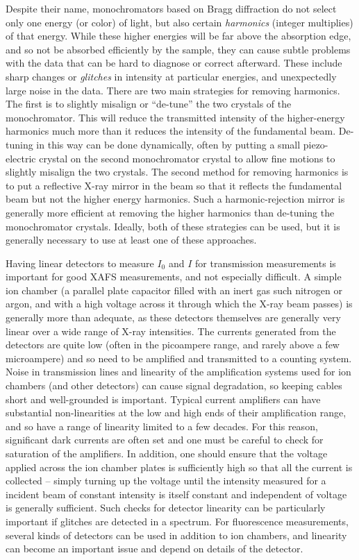Despite their name, monochromators based on Bragg diffraction do not select
only one energy (or color) of light, but also certain {\emph{harmonics}}
(integer multiplies) of that energy.  While these higher energies will be
far above the absorption edge, and so not be absorbed efficiently by the
sample, they can cause subtle problems with the data that can be hard to
diagnose or correct afterward.  These include sharp changes or
{\emph{glitches}} in intensity at particular energies, and unexpectedly
large noise in the data.  There are two main strategies for removing
harmonics.  The first is to slightly misalign or ``de-tune'' the two
crystals of the monochromator.  This will reduce the transmitted intensity
of the higher-energy harmonics much more than it reduces the intensity of
the fundamental beam.  De-tuning in this way can be done dynamically, often
by putting a small piezo-electric crystal on the second monochromator
crystal to allow fine motions to slightly misalign the two crystals.  The
second method for removing harmonics is to put a reflective X-ray mirror in
the beam so that it reflects the fundamental beam but not the higher energy
harmonics.  Such a harmonic-rejection mirror is generally more efficient at
removing the higher harmonics than de-tuning the monochromator crystals.
Ideally, both of these strategies can be used, but it is generally
necessary to use at least one of these approaches.

Having linear detectors to measure $I_0$ and $I$ for transmission
measurements is important for good XAFS measurements, and not especially
difficult.  A simple ion chamber (a parallel plate capacitor filled with an
inert gas such nitrogen or argon, and with a high voltage across it through
which the X-ray beam passes) is generally more than adequate, as these
detectors themselves are generally very linear over a wide range of X-ray
intensities.  The currents generated from the detectors are quite low
(often in the picoampere range, and rarely above a few microampere) and so
need to be amplified and transmitted to a counting system.  Noise in
transmission lines and linearity of the amplification systems used for ion
chambers (and other detectors) can cause signal degradation, so keeping
cables short and well-grounded is important.  Typical current amplifiers
can have substantial non-linearities at the low and high ends of their
amplification range, and so have a range of linearity limited to a few
decades.  For this reason, significant dark currents are often set and one
must be careful to check for saturation of the amplifiers.  In addition,
one should ensure that the voltage applied across the ion chamber plates is
sufficiently high so that all the current is collected -- simply turning up
the voltage until the intensity measured for a incident beam of constant
intensity is itself constant and independent of voltage is generally
sufficient.  Such checks for detector linearity can be particularly
important if glitches are detected in a spectrum.  For fluorescence
measurements, several kinds of detectors can be used in addition to ion
chambers, and linearity can become an important issue and depend on details
of the detector.

